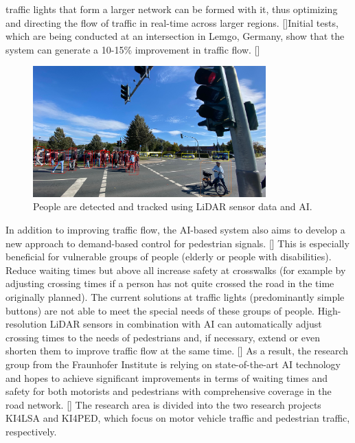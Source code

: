 traffic lights that form a larger network can be formed with it, thus optimizing and directing the flow of traffic in real-time across larger regions. [\citet{bundesministerium_für_wirtschaft_und_klimaschutz_2022}]Initial tests, which are being conducted at an intersection in Lemgo, Germany, show that the system can generate a 10-15\% improvement in traffic flow.  [\citet{optimized_traffic_flows_and_improved_pedestrian_safety_2022}]\newline
 \begin{figure}[h]
        \centering
        \includegraphics[width=0.8\textwidth]{paper-template/figs/traffic_lights1.jpg}
        \caption{People are detected and tracked using LiDAR sensor data and AI.}
        \label{fig:my_label}
    \end{figure}\newline
In addition to improving traffic flow, the AI-based system also aims to develop a new approach to demand-based control for pedestrian signals.  [\citet{optimized_traffic_flows_and_improved_pedestrian_safety_2022}] This is especially beneficial for vulnerable groups of people (elderly or people with disabilities). Reduce waiting times but above all increase safety at crosswalks (for example by adjusting crossing times if a person has not quite crossed the road in the time originally planned). The current solutions at traffic lights (predominantly simple buttons) are not able to meet the special needs of these groups of people. High-resolution LiDAR sensors in combination with AI can automatically adjust crossing times to the needs of pedestrians and, if necessary, extend or even shorten them to improve traffic flow at the same time. [\citet{publisher_2022}]
As a result, the research group from the Fraunhofer Institute is relying on state-of-the-art AI technology and hopes to achieve significant improvements in terms of waiting times and safety for both motorists and pedestrians with comprehensive coverage in the road network. [\citet{optimized_traffic_flows_and_improved_pedestrian_safety_2022}] The research area is divided into the two research projects KI4LSA and KI4PED, which focus on motor vehicle traffic and pedestrian traffic, respectively.\newpage
